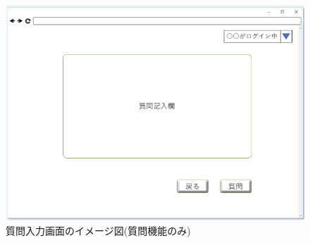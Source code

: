 \begin{figure}[phtbp]
  \begin{center}
    \includegraphics[width=1\linewidth,clip]{./img/37.png}
    \caption{質問入力画面のイメージ図(質問機能のみ)}\label{fig:37}
  \end{center}
\end{figure}

\newpage
